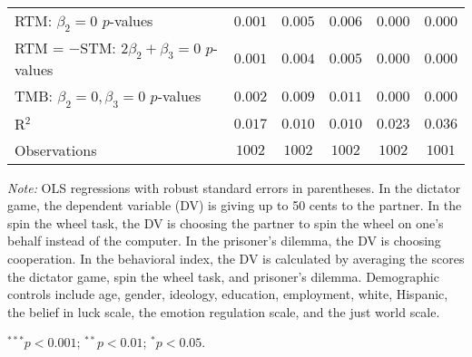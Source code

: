 \begin{table}[!ht]
\begin{center}
{\begin{threeparttable}
\begin{tabular}{l c c c c c}
RTM: $\beta_2 = 0$ $p$-values                   & $0.001$        & $0.005$       & $0.006$       & $0.000$       & $0.000$       \\
RTM = $-$STM: $2\beta_2+\beta_3 = 0$ $p$-values & $0.001$        & $0.004$       & $0.005$       & $0.000$       & $0.000$       \\
TMB: $\beta_2 = 0, \beta_3 = 0$ $p$-values      & $0.002$        & $0.009$       & $0.011$       & $0.000$       & $0.000$       \\
R$^2$                                           & $0.017$        & $0.010$       & $0.010$       & $0.023$       & $0.036$       \\
Observations                                    & $1002$         & $1002$        & $1002$        & $1002$        & $1001$        \\
\bottomrule
\end{tabular}
\begin{tablenotes}[flushleft]
\scriptsize{\item[\hspace{-5mm}] \textit{Note:} OLS regressions with robust standard errors in parentheses. 
                                In the dictator game, the dependent variable (DV) is giving up to 50 cents to the partner. 
                                In the spin the wheel task, the DV is choosing the partner to spin the wheel on one’s behalf instead of the computer. 
                                In the prisoner’s dilemma, the DV is choosing cooperation. 
                                In the behavioral index, the DV is calculated by averaging the scores the dictator game, spin the wheel task, and prisoner's dilemma.
                                Demographic controls include age, gender, ideology,
                                education, employment, white, Hispanic, the belief in luck scale, the emotion regulation scale, and the just world scale. \item[\hspace{-5mm}] $^{***}p<0.001$; $^{**}p<0.01$; $^{*}p<0.05$.}
\end{tablenotes}
\end{threeparttable}
}
\label{tab:behavior_shared_regression}
\end{center}
\end{table}

\renewcommand{\baselinestretch}{1.67}%

